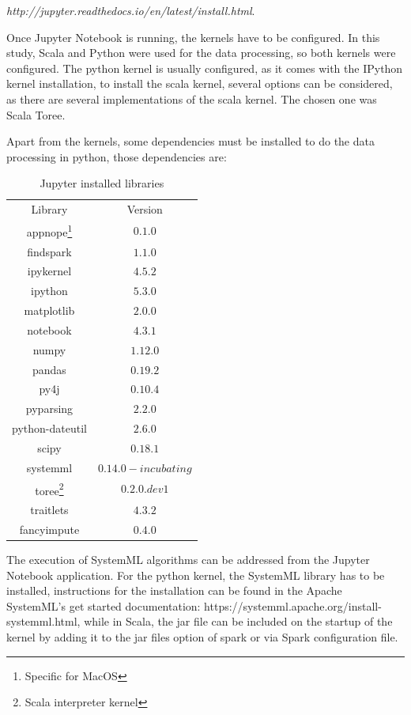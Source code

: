 \documentclass[11pt]{book} %
\begin{document}
    \emph{http://jupyter.readthedocs.io/en/latest/install.html}.

    Once Jupyter Notebook is running, the kernels have to be configured. In this study, Scala and Python were used for the data processing, so both kernels were configured. The python kernel is usually configured, as it comes with the IPython kernel installation, to install the scala kernel, several options can be considered, as there are several implementations of the scala kernel. The chosen one was Scala Toree.

    Apart from the kernels, some dependencies must be installed to do the data processing in python, those dependencies are:

    \begin{table}[!ht]
      \centering
      \begin{tabular}{ c c }
        \hline

          Library & Version \\
          appnope\footnote{Specific for MacOS} & $0.1.0$ \\
          findspark & $1.1.0$ \\
          ipykernel & $4.5.2$ \\
          ipython & $5.3.0$ \\
          matplotlib & $2.0.0$ \\
          notebook & $4.3.1$ \\
          numpy & $1.12.0$ \\
          pandas & $0.19.2$ \\
          py4j & $0.10.4$ \\
          pyparsing & $2.2.0$ \\
          python-dateutil & $2.6.0$ \\
          scipy & $0.18.1$ \\
          systemml & $0.14.0-incubating$ \\
          toree\footnote{Scala interpreter kernel} & $0.2.0.dev1$ \\
          traitlets & $4.3.2$ \\
          fancyimpute & $0.4.0$ \\

        \hline
      \end{tabular}
      \caption{Jupyter installed libraries}
      \label{tab:python_libraries}
    \end{table}

    The execution of SystemML algorithms can be addressed from the Jupyter Notebook application. For the python kernel, the SystemML library has to be installed, instructions for the installation can be found in the Apache SystemML's get started documentation: https://systemml.apache.org/install-systemml.html, while in Scala, the jar file can be included on the startup of the kernel by adding it to the jar files option of spark or via Spark configuration file.
\end{document}
